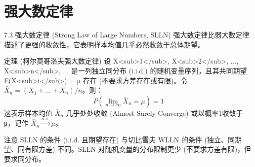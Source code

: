 \documentclass[UTF8]{beamer} %
\begin{document}
\section{强大数定律}
\begin{frame}{7.3 强大数定律 (Strong Law of Large Numbers, SLLN)}
    强大数定律比弱大数定律描述了更强的收敛性，它表明样本均值\alert{几乎必然收敛}于总体期望。
    \vspace{0.5cm}

    \begin{block}{定理 (柯尔莫哥洛夫强大数定律)}
        设 X<sub>1</sub>, X<sub>2</sub>, ..., X<sub>n</sub>, ... 是一列\alert{独立同分布} (i.i.d.) 的随机变量序列，且其共同期望 E(X<sub>i</sub>) = μ \alert{存在} (不要求方差存在或有限)。令 \( \bar{X}_n = (X_1 + ... + X_n) / n \)。则：
        \[ P\left( \lim_{n \to \infty} \bar{X}_n = \mu \right) = 1 \]
        这表示样本均值 \( \bar{X}_n \) \alert{几乎处处收敛} (Almost Surely Converge) 或以概率1收敛于 μ，记作 \( \bar{X}_n \xrightarrow{a.s.} \mu \)。
    \end{block}
    \pause
    \begin{alertblock}{注意}
        SLLN 的条件 (i.i.d. 且期望存在) 与切比雪夫 WLLN 的条件 (独立、同期望、同有限方差) 不同。SLLN 对随机变量的分布限制更少 (不要求方差有限)，但要求同分布。
    \end{alertblock}
\end{frame}
\end{document}

